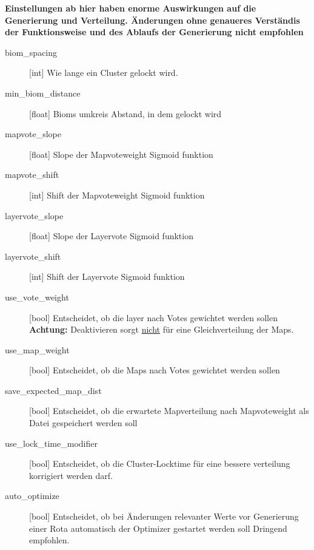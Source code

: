 \newpage
\textbf{Einstellungen ab hier haben enorme Auswirkungen auf die Generierung und Verteilung.
Änderungen ohne genaueres Verständis der Funktionsweise und des Ablaufs der Generierung nicht empfohlen}
\begin{description}
    \item[biom\_spacing][int] \newline
        Wie lange ein Cluster gelockt wird.
    \item[min\_biom\_distance][float] \newline
        Bioms umkreis Abstand, in dem gelockt wird
    \item[mapvote\_slope][float] \newline
        Slope der Mapvoteweight Sigmoid funktion
    \item[mapvote\_shift][int] \newline
        Shift der Mapvoteweight Sigmoid funktion
    \item[layervote\_slope][float] \newline
        Slope der Layervote Sigmoid funktion
    \item[layervote\_shift][int] \newline
        Shift der Layervote Sigmoid funktion
    \item[use\_vote\_weight][bool] \newline
        Entscheidet, ob die layer nach Votes gewichtet werden sollen \newline
        \textbf{Achtung:} Deaktivieren sorgt \underline{nicht} für eine Gleichverteilung der Maps.
    \item[use\_map\_weight][bool] \newline
        Entscheidet, ob die Maps nach Votes gewichtet werden sollen
    \item[save\_expected\_map\_dist][bool] \newline
        Entscheidet, ob die erwartete Mapverteilung nach Mapvoteweight als Datei gespeichert werden soll
    \item[use\_lock\_time\_modifier][bool] \newline
        Entscheidet, ob die Cluster-Locktime für eine bessere verteilung korrigiert werden darf.
    \item[auto\_optimize][bool] \newline
        Entscheidet, ob bei Änderungen relevanter Werte vor Generierung einer Rota automatisch der Optimizer gestartet werden soll
        Dringend empfohlen.
\end{description}
